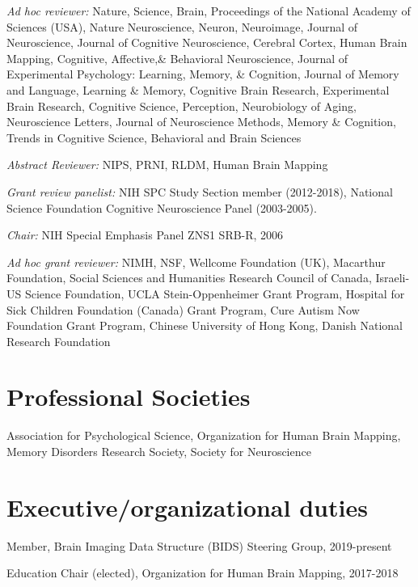 \documentclass[10pt, letterpaper]{article}
\begin{document}
\textit{Ad hoc reviewer:} Nature, Science, Brain, Proceedings of the National Academy of Sciences (USA), Nature Neuroscience, Neuron, Neuroimage, Journal of Neuroscience, Journal of Cognitive Neuroscience, Cerebral Cortex, Human Brain Mapping, Cognitive, Affective,\& Behavioral Neuroscience, Journal of Experimental Psychology: Learning, Memory, \& Cognition, Journal of Memory and Language, Learning \& Memory, Cognitive Brain Research, Experimental Brain Research, Cognitive Science, Perception, Neurobiology of Aging, Neuroscience Letters, Journal of Neuroscience Methods, Memory \& Cognition, Trends in Cognitive Science, Behavioral and Brain Sciences\vspace{2mm}

\textit{Abstract Reviewer:} NIPS, PRNI, RLDM, Human Brain Mapping\vspace{2mm}

\textit{Grant review panelist:} NIH SPC Study Section member (2012-2018), National Science Foundation Cognitive Neuroscience Panel (2003-2005).\vspace{2mm}

\textit{Chair:} NIH Special Emphasis Panel ZNS1 SRB-R, 2006
\vspace{2mm}

\textit{Ad hoc grant reviewer:} NIMH, NSF, Wellcome Foundation (UK), Macarthur Foundation, Social Sciences and Humanities Research Council of Canada, Israeli-US Science Foundation, UCLA Stein-Oppenheimer Grant Program, Hospital for Sick Children Foundation (Canada) Grant Program, Cure Autism Now Foundation Grant Program, Chinese University of Hong Kong, Danish National Research Foundation

\section*{Professional Societies}
\noindent
Association for Psychological Science, Organization for Human Brain Mapping, Memory Disorders Research Society, Society for Neuroscience

\section*{Executive/organizational duties}
\noindent

Member, Brain Imaging Data Structure (BIDS) Steering Group, 2019-present  \vspace{2mm} 

Education Chair (elected), Organization for Human Brain Mapping, 2017-2018  \vspace{2mm} 
\end{document}
